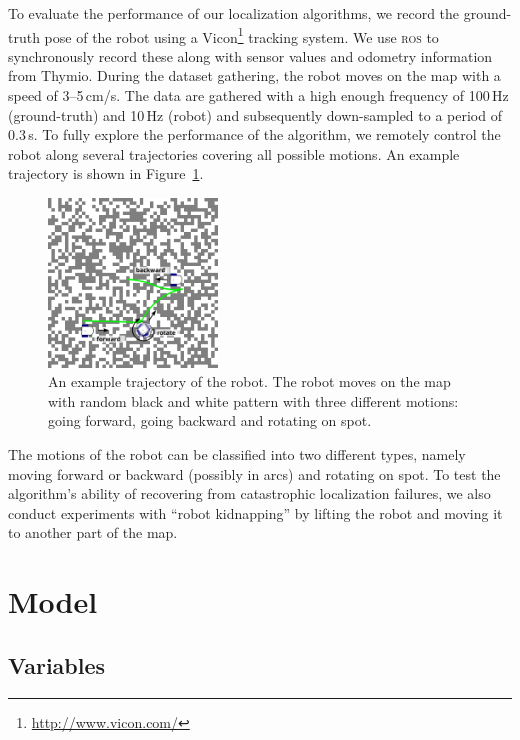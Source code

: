 \documentclass[letterpaper, 10pt, conference]{ieeeconf}
\newcommand{\fig}[1]{Figure~\ref{fig:#1}}
\begin{document}
To evaluate the performance of our localization algorithms, we record the ground-truth pose of the robot using a Vicon\footnote{\url{http://www.vicon.com/}} tracking system.
We use \textsc{ros} to synchronously record these along with sensor values and odometry information from Thymio.
During the dataset gathering, the robot moves on the map with a speed of 3--5\,cm/s.
The data are gathered with a high enough frequency of 100\,Hz (ground-truth) and 10\,Hz (robot) and subsequently down-sampled to a period of 0.3\,s.
To fully explore the performance of the algorithm, we remotely control the robot along several trajectories covering all possible motions.
An example trajectory is shown in \fig{dataset}.

\begin{figure}
\begin{center}
\includegraphics[width=0.4\textwidth]{dataset}
\caption{An example trajectory of the robot. The robot moves on the map with random black and white pattern with three different motions: going forward, going backward and rotating on spot.}
\label{fig:dataset}
\end{center}
\end{figure}

The motions of the robot can be classified into two different types, namely moving forward or backward (possibly in arcs) and rotating on spot.
To test the algorithm's ability of recovering from catastrophic localization failures, we also conduct experiments with ``robot kidnapping'' by lifting the robot and moving it to another part of the map.

\section{Model}

\subsection{Variables}
\end{document}
